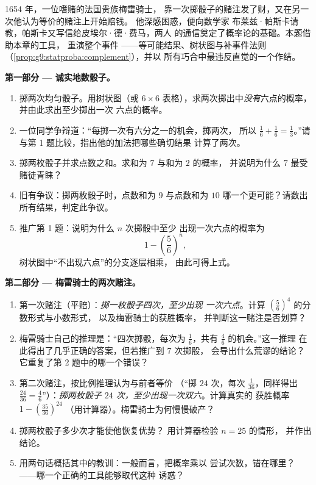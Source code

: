\begin{problem}
\label{pb:g9:statproba:1}
1654 年，一位嗜赌的法国贵族梅雷骑士，
靠一次掷骰子的赌注发了财，又在另一次他认为等价的赌注上开始赔钱。
他深感困惑，便向数学家
布莱兹·帕斯卡请教，帕斯卡又写信给皮埃尔·德·费马，两人
的通信奠定了概率论的基础。本题借助本章的工具，
重演整个事件
——等可能结果、树状图与补事件法则
（\cref{prop:g9:statproba:complement}），并以
所有巧合中最违反直觉的一个作结。

\medskip
\noindent\textbf{第一部分 --- 诚实地数骰子。}
\begin{enumerate}
  \item 掷两次均匀骰子。用树状图（或 $6 \times 6$
        表格），求两次掷出中\emph{没有}六点的概率，
        并由此求出至少掷出一次
        六点的概率。
  \item 一位同学争辩道：“每掷一次有六分之一的机会，掷两次，
        所以 $\frac16 + \frac16 = \frac13$。”请与第
        1 题比较，指出他的加法把哪些确切结果
        计算了两次。
  \item 掷两枚骰子并求点数之和。求和为 $7$ 与和为 $2$ 的概率，
        并说明为什么 $7$ 最受
        赌徒青睐？
  \item 旧有争议：掷两枚骰子时，点数和为 $9$ 与点数和为
        $10$ 哪一个更可能？请数出所有结果，判定此争议。
  \item 推广第 1 题：说明为什么 $n$ 次掷骰中至少
        出现一次六点的概率为
        \[
        1 - \left(\frac56\right)^{\!n} ,
        \]
        树状图中“不出现六点”的分支逐层相乘，
        由此可得上式。
\end{enumerate}

\medskip
\noindent\textbf{第二部分 --- 梅雷骑士的两次赌注。}
\begin{enumerate}[resume]
  \item 第一次赌注（平赔）：\emph{掷一枚骰子四次，至少出现
        一次六点}。计算
        $\left(\frac56\right)^4$ 的分数形式与小数形式，
        以及梅雷骑士的获胜概率，
        并判断这一赌注是否划算？
  \item 梅雷骑士自己的推理是：“四次掷骰，每次为
        $\frac16$，共有 $\frac46$ 的机会。”这一推理
        在此得出了几乎正确的答案，但若推广到 $7$ 次掷骰，
        会导出什么荒谬的结论？它重复了第 2
        题中的哪一个错误？
  \item 第二次赌注，按比例推理认为与前者等价
        （“掷 $24$ 次，每次 $\frac1{36}$，同样得出
        $\frac{24}{36} = \frac46$”）：\emph{掷两枚骰子
        $24$ 次，至少出现一次双六}。计算真实的
        获胜概率 $1 - \left(\frac{35}{36}\right)^{24}$
        （用计算器）。梅雷骑士为何慢慢破产？
  \item 掷两枚骰子多少次才能使他恢复优势？
        用计算器检验 $n = 25$ 的情形，
        并作出结论。
  \item 用两句话概括其中的教训：一般而言，把概率乘以
        尝试次数，错在哪里？
        ——哪一个正确的工具能够取代这种
        诱惑？
\end{enumerate}


\end{problem}

